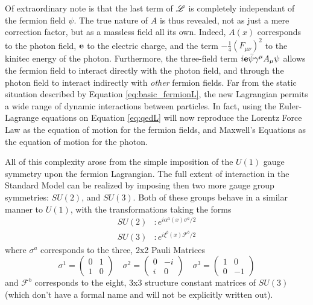     Of extraordinary note is that the last term of $\mathscr{L}$ is completely independant of the fermion field $\psi$.
    The true nature of $A$ is thus revealed, not as just a mere correction factor,
        but as a massless field all its own.
    Indeed, $A(x)$ corresponds to the photon field, $\mathbf{e}$ to the electric charge,
        and the term $-\frac{1}{4}(F_{\mu\nu})^2$ to the kinitec energy of the photon.
    Furthermore, the three-field term $i \mathbf{e} \bar{\psi} \gamma^\mu A_\mu \psi$
        allows the fermion field to interact directly with the photon field,
        and through the photon field to interact indirectly with \textit{other} fermion fields.
    Far from the static situation described by Equation \ref{eq:basic_fermionL},
        the new Lagrangian permits a wide range of dynamic interactions between particles.
    In fact, using the Euler-Lagrange equations on Equation \ref{eq:qedL}
        will now reproduce the Lorentz Force Law as the equation of motion for the fermion fields,
        and Maxwell's Equations as the equation of motion for the photon.

    All of this complexity arose from the simple imposition of the $U(1)$ gauge symmetry upon the fermion Lagrangian.
    The full extent of interaction in the Standard Model can be realized by imposing then two more gauge group symmetries:
        $SU(2)$, and $SU(3)$.
    Both of these groups behave in a similar manner to $U(1)$, with the transformations taking the forms
    \begin{equation} \begin{split}
        SU(2)&: e^{i \alpha^a(x) \sigma^a / 2}
        \\SU(3)&: e^{i \xi^b(x) \mathscr{F}^b / 2}
    \end{split} \end{equation}
    where $\sigma^a$ corresponds to the three, 2x2 Pauli Matrices
    \begin{equation}
        \sigma^1 = \begin{pmatrix} 0 & 1 \\ 1 & 0 \end{pmatrix} \quad
        \sigma^2 = \begin{pmatrix} 0 & -i \\ i & 0 \end{pmatrix} \quad
        \sigma^3 = \begin{pmatrix} 1 & 0 \\ 0 & -1 \end{pmatrix}
    \end{equation}
    and $\mathscr{F}^b$ corresponds to the eight, 3x3 structure constant matrices of $SU(3)$
        (which don't have a formal name and will not be explicitly written out).

